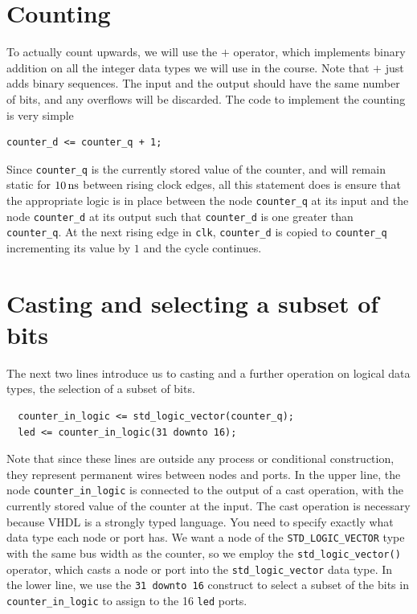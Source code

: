 \documentclass[../physical_computing.tex]{subfiles}
\begin{document}
\section{Counting}
\label{sec:counting}

To actually count upwards, we will use the $+$ operator, which implements binary addition on all the integer data types we will use in the course. Note that $+$ just adds binary sequences. The input and the output should have the same number of bits, and any overflows will be discarded. The code to implement the counting is very simple

\begin{verbatim}
counter_d <= counter_q + 1; 
\end{verbatim}

Since \texttt{counter\_q} is the currently stored value of the counter, and will remain static for $\rm 10\,ns$ between rising clock edges, all this statement does is ensure that the appropriate logic is in place between the node \texttt{counter\_q} at its input and the node \texttt{counter\_d} at its output such that \texttt{counter\_d} is one greater than \texttt{counter\_q}. At the next rising edge in \texttt{clk}, \texttt{counter\_d} is copied to \texttt{counter\_q} incrementing its value by $1$ and the cycle continues.

\section{Casting and selecting a subset of bits}
\label{sec:castandsubset}

The next two lines introduce us to casting and a further operation on logical data types, the selection of a subset of bits. 

\begin{verbatim}
  counter_in_logic <= std_logic_vector(counter_q);
  led <= counter_in_logic(31 downto 16);
\end{verbatim}

Note that since these lines are outside any process or conditional construction, they represent permanent wires between nodes and ports. In the upper line, the node \texttt{counter\_in\_logic} is connected to the output of a cast operation, with the currently stored value of the counter at the input. The cast operation is necessary because VHDL is a strongly typed language. You need to specify exactly what data type each node or port has. We want a node of the \texttt{STD\_LOGIC\_VECTOR} type with the same bus width as the 
counter, so we employ the \texttt{std\_logic\_vector()} operator, which casts a node or port into the \texttt{std\_logic\_vector} data type. In the lower line, we use the \texttt{31 downto 16} construct to select a subset of the bits in \texttt{counter\_in\_logic} to assign to the 16 \texttt{led} ports.
\end{document}
